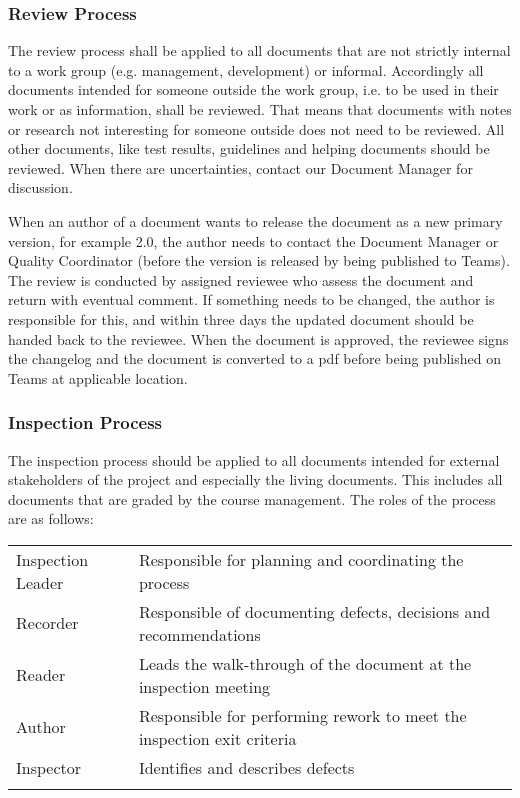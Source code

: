 \documentclass{article}
\begin{document}
	\subsubsection{Review Process}
	The review process shall be applied to all documents that are not strictly internal to a work group (e.g. management, development) or informal. Accordingly all documents intended for someone outside the work group, i.e. to be used in their work or as information, shall be reviewed. 
	That means that documents with notes or research not interesting for someone outside does not need to be reviewed. All other documents, like test results, guidelines and helping documents should be reviewed. When there are uncertainties, contact our Document Manager for discussion.
	
	When an author of a document wants to release the document as a new primary version, for example 2.0, the author needs to contact the Document Manager or Quality Coordinator (before the version is released by being published to Teams). The review is conducted by assigned reviewee who assess the document and return with eventual comment. If something needs to be changed, the author is responsible for this, and within three days the updated document should be handed back to the reviewee. When the document is approved, the reviewee signs the changelog and the document is converted to a pdf before being published on Teams at applicable location.
	
	\subsubsection{Inspection Process}
	The inspection process should be applied to all documents intended for external stakeholders of the project and especially the living documents. This includes all documents that are graded by the course management.
	The roles of the process are as follows:
	
	\smallskip
	\begin{table}[h]
		\begin{tabularx}{\textwidth}{lX}
			Inspection Leader & Responsible for planning and coordinating the process \\
			Recorder & Responsible of documenting defects, decisions and recommendations \\
			Reader & Leads the walk-through of the document at the inspection meeting \\
			Author & Responsible for performing rework to meet the inspection exit criteria \\
			Inspector & Identifies and describes defects \\
			&  \\
		\end{tabularx}
	\end{table}
	
\end{document}
